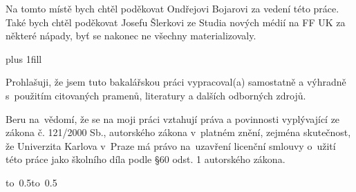 \documentclass[12pt,a4paper]{report}
\let\openright=\clearpage
\begin{document}
\newpage



\openright

\noindent
Na tomto místě bych chtěl poděkovat Ondřejovi Bojarovi za vedení této práce. Také bych chtěl poděkovat Josefu Šlerkovi ze Studia nových médií na FF UK za některé nápady, byť se nakonec ne všechny materializovaly.

\newpage

\vglue 0pt plus 1fill

\noindent
Prohlašuji, že jsem tuto bakalářskou práci vypracoval(a) samostatně a výhradně
s~použitím citovaných pramenů, literatury a dalších odborných zdrojů.

\medskip\noindent
Beru na~vědomí, že se na moji práci vztahují práva a povinnosti vyplývající
ze zákona č. 121/2000 Sb., autorského zákona v~platném znění, zejména skutečnost,
že Univerzita Karlova v~Praze má právo na~uzavření licenční smlouvy o~užití této
práce jako školního díla podle §60 odst. 1 autorského zákona.

\vspace{10mm}

\hbox{\hbox to 0.5\hbox to 0.5}


\vspace{20mm}
\newpage

\newcommand{\kecycz}{
Název práce:
Sledování témat v~elektronickém zpravodajství

Autor:
Karel Bílek

Katedra:  %
Ústav formální a aplikované lingvistiky

Vedoucí bakalářské práce:
RNDr. Ondřej Bojar, Ph.D., Ústav formální a aplikované lingvistiky

Abstrakt:
V~této práci se snažím nalézt definici zpravodajského tématu tak, aby byla detekce těchto témat v~textu implementovatelná a kvalita této detekce měřitelná. Popisuji možné metody --- \uv{prosté} počítání slov, případně se zavedením stopslov; TF-IDF; dále popisuji problém textové klasifikace, mírně se dotknu text clusteringu. Dále popisuji přístupy, nazvané latent semantic indexing a latent Dirichlet allocation. Také popisuji experimenty s~\uv{prostým} počítáním slov, TF-IDF a textovou klasifikací na databázi článků z~několika elektronických zdrojů; vznik této databáze v~práci popisuji rovněž. Ke způsobu řešení pomocí textové klasifikace uvádím metriku pomocí měření přesnosti a úplnosti; podle těchto metrik měřím několik variant textové klasifikace.

Klíčová slova:
Zpravodajství, články, témata, klíčová slova
}
\end{document}
